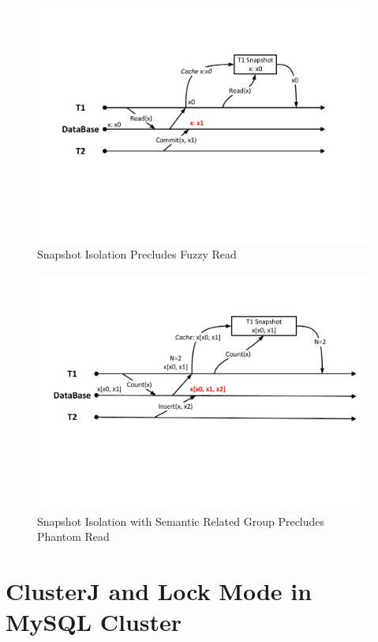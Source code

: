 \begin{figure}[!h]
	\centering
	\includegraphics[width=\linewidth]{figs/snapfuzzy.pdf}
	\caption{Snapshot Isolation Precludes Fuzzy Read}
	\label{fig:snapfuzzy}
\end{figure}

\begin{figure}[!h]
	\centering
	\includegraphics[width=\linewidth]{figs/snapphantom.pdf}
	\caption{Snapshot Isolation with Semantic Related Group Precludes Phantom Read}
	\label{fig:snapphantom}
\end{figure}
  
\section{ClusterJ and Lock Mode in MySQL Cluster}

